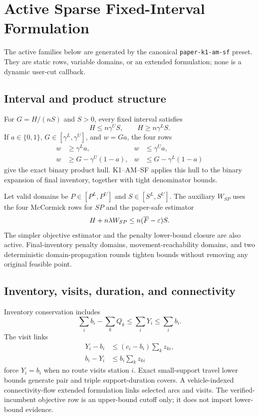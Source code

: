 \section{Active Sparse Fixed-Interval Formulation}
The active families below are generated by the canonical
\texttt{paper-k1-am-sf} preset. They are static rows, variable domains, or an
extended formulation; none is a dynamic user-cut callback.

\subsection{Interval and product structure}
For $G=H/(nS)$ and $S>0$, every fixed interval satisfies
\begin{equation}
 H\leq n\gamma^U S,\qquad H\geq n\gamma^L S. \label{eq:direct-gini}
\end{equation}
If $a\in\{0,1\}$, $G\in[\gamma^L,\gamma^U]$, and $w=Ga$, the four rows
\begin{align}
w&\geq\gamma^L a,&w&\leq\gamma^U a,\\
w&\geq G-\gamma^U(1-a),&w&\leq G-\gamma^L(1-a)
\end{align}
give the exact binary product hull. K1--AM--SF applies this hull to the binary
expansion of final inventory, together with tight denominator bounds.

Let valid domains be $P\in[P^L,P^U]$ and $S\in[S^L,S^U]$. The auxiliary
$W_{SP}$ uses the four McCormick rows for $SP$ and the paper-safe estimator
\begin{equation}
 H+n\lambda W_{SP}\leq n(\overline F-\varepsilon)S. \label{eq:sp-estimator}
\end{equation}
The simpler objective estimator and the penalty lower-bound closure are also
active. Final-inventory penalty domains, movement-reachability domains, and two
deterministic domain-propagation rounds tighten bounds without removing any
original feasible point.

\subsection{Inventory, visits, duration, and connectivity}
Inventory conservation includes
\begin{equation}
 \sum_i b_i-\sum_k Q_k\leq\sum_iY_i\leq\sum_i b_i.
\end{equation}
The visit links
\begin{align}
Y_i-b_i&\leq(c_i-b_i)\sum_kz_{ki},\\
b_i-Y_i&\leq b_i\sum_kz_{ki}
\end{align}
force $Y_i=b_i$ when no route visits station $i$. Exact small-support travel
lower bounds generate pair and triple support-duration covers. A
vehicle-indexed connectivity-flow extended formulation links selected arcs and
visits. The verified-incumbent objective row is an upper-bound cutoff only; it
does not import lower-bound evidence.

